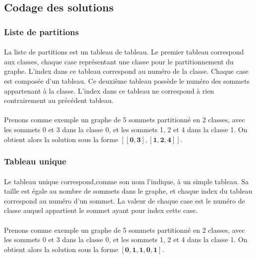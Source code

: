 \documentclass[12pt]{article}
\begin{document}
\subsection{Codage des solutions}

\subsubsection{Liste de partitions}

\paragraph{}La liste de partitions est un tableau de tableau. Le premier tableau correspond aux classes, chaque case représentant une classe pour le partitionnement du graphe. L'index dans ce tableau correspond au numéro de la classe. Chaque case est composée d'un tableau. Ce deuxième tableau possède le numéro des sommets appartenant à la classe. L'index dans ce tableau ne correspond à rien contrairement au précédent tableau.

\paragraph{}Prenons comme exemple un graphe de 5 sommets partitionné en 2 classes, avec les sommets 0 et 3 dans la classe 0, et les sommets 1, 2 et 4 dans la classe 1. On obtient alors la solution sous la forme $\mathbf{[[0,3],[1,2,4]]}$.

\subsubsection{Tableau unique}

\paragraph{}Le tableau unique correspond,comme son nom l'indique, à un simple tableau. Sa taille est égale au nombre de sommets dans le graphe, et chaque index du tableau correspond au numéro d'un sommet. La valeur de chaque case est le numéro de classe auquel appartient le sommet ayant pour index cette case.

\paragraph{}Prenons comme exemple un graphe de 5 sommets partitionné en 2 classes, avec les sommets 0 et 3 dans la classe 0, et les sommets 1, 2 et 4 dans la classe 1. On obtient alors la solution sous la forme $\mathbf{[0,1,1,0,1]}$.
\end{document}
